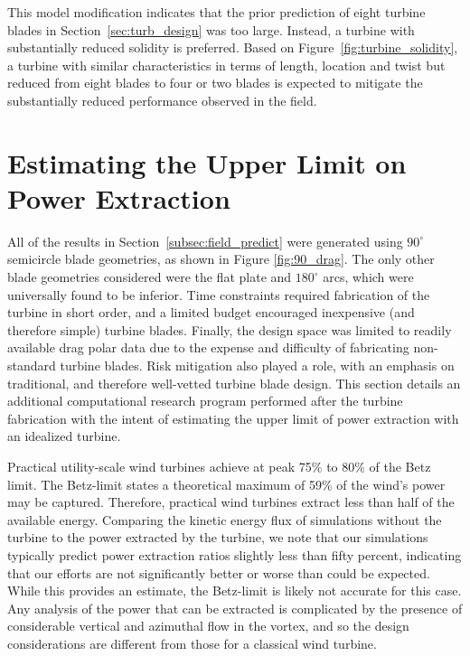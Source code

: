 This model modification indicates that the prior prediction of eight
turbine blades in Section~\ref{sec:turb_design} was too large. Instead,
a turbine with substantially reduced solidity is preferred. Based on
Figure~\ref{fig:turbine_solidity}, a turbine with similar
characteristics in terms of length, location and twist but reduced from
eight blades to four or two blades is expected to mitigate the
substantially reduced performance observed in the field. 


\section{Estimating the Upper Limit on Power Extraction}
\label{sec:peak_estimate}

All of the results in Section~\ref{subsec:field_predict} were generated
using $90^{\circ}$ semicircle blade geometries, as shown in Figure
\ref{fig:90_drag}. The only other blade geometries considered were the
flat plate and $180^{\circ}$ arcs, which were universally found to be
inferior. Time constraints required fabrication of the turbine in short
order, and a limited budget encouraged inexpensive (and therefore
simple) turbine blades. Finally, the design space was limited to
readily available drag polar data due to the expense and difficulty of 
fabricating non-standard turbine blades. Risk mitigation also played a
role, with an emphasis on traditional, and therefore well-vetted turbine
blade design. %
This section details an additional computational research program
performed after the turbine fabrication with the intent of estimating
the upper limit of power extraction with an idealized turbine. 

Practical utility-scale wind turbines achieve at peak 75\% to 80\% of
the Betz limit\cite{burton2001wind}. The Betz-limit states a theoretical
maximum of 59\% of the wind's power may be captured. Therefore,
practical wind turbines extract less than half of the available energy. 
Comparing the kinetic energy flux of simulations without the turbine to
the power extracted by the turbine, we note that our simulations
typically predict power extraction ratios slightly less than fifty
percent, indicating that our efforts are not significantly better or
worse than could be expected. While this provides an estimate, the
Betz-limit is likely not accurate for this case. Any analysis of the
power that can be extracted is complicated by the presence of
considerable vertical and azimuthal flow in the vortex, and so the
design considerations are different from those for a classical wind
turbine.  

